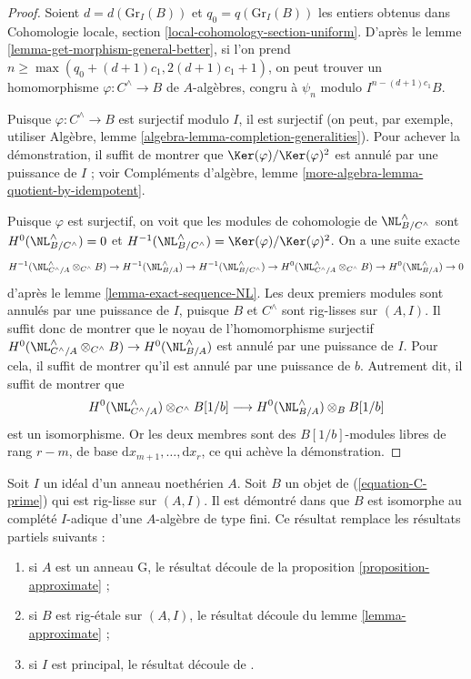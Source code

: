 \begin{proof}
\medskip\noindent
Soient $d = d(\text{Gr}_I(B))$ et $q_0 = q(\text{Gr}_I(B))$ les entiers
obtenus dans Cohomologie locale, section
\ref{local-cohomology-section-uniform}. D'après le lemme
\ref{lemma-get-morphism-general-better}, si l'on prend
$n \geq \max(q_0 + (d + 1)c_1, 2(d + 1)c_1 + 1)$, on peut trouver un
homomorphisme $\varphi : C^\wedge \to B$ de $A$-algèbres, congru à $\psi_n$
modulo $I^{n - (d + 1)c_1}B$.

\medskip\noindent
Puisque $\varphi : C^\wedge \to B$ est surjectif modulo $I$, il est surjectif
(on peut, par exemple, utiliser Algèbre, lemme
\ref{algebra-lemma-completion-generalities}). Pour achever la démonstration, il
suffit de montrer que $\Ker(\varphi)/\Ker(\varphi)^2$ est annulé par une
puissance de $I$ ; voir Compléments d'algèbre, lemme
\ref{more-algebra-lemma-quotient-by-idempotent}.

\medskip\noindent
Puisque $\varphi$ est surjectif, on voit que les modules de cohomologie de
$\NL_{B/C^{\wedge}}^\wedge$ sont
$H^0(\NL_{B/C^{\wedge}}^\wedge) = 0$ et
$H^{-1}(\NL_{B/C^{\wedge}}^\wedge) = \Ker(\varphi)/\Ker(\varphi)^2$.
On a une suite exacte
$$
H^{-1}(\NL_{C^\wedge/A}^\wedge \otimes_{C^\wedge} B) \to
H^{-1}(\NL_{B/A}^\wedge) \to
H^{-1}(\NL_{B/C^{\wedge}}^\wedge) \to
H^0(\NL_{C^\wedge/A}^\wedge \otimes_{C^\wedge} B) \to
H^0(\NL_{B/A}^\wedge) \to 0
$$
d'après le lemme \ref{lemma-exact-sequence-NL}. Les deux premiers modules sont
annulés par une puissance de $I$, puisque $B$ et $C^\wedge$ sont rig-lisses
sur $(A, I)$. Il suffit donc de montrer que le noyau de l'homomorphisme
surjectif
$H^0(\NL_{C^\wedge/A}^\wedge \otimes_{C^\wedge} B) \to
H^0(\NL_{B/A}^\wedge)$ est annulé par une puissance de $I$. Pour cela, il
suffit de montrer qu'il est annulé par une puissance de $b$. Autrement dit,
il suffit de montrer que
$$
H^0(\NL_{C^\wedge/A}^\wedge) \otimes_{C^\wedge} B[1/b]
\longrightarrow
H^0(\NL_{B/A}^\wedge) \otimes_B B[1/b]
$$
est un isomorphisme. Or les deux membres sont des $B[1/b]$-modules libres de
rang $r - m$, de base $\text{d}x_{m + 1}, \ldots, \text{d}x_r$, ce qui achève
la démonstration.
\end{proof}

\begin{remark}
\label{remark-discussion}
Soit $I$ un idéal d'un anneau noethérien $A$. Soit $B$ un objet de
(\ref{equation-C-prime}) qui est rig-lisse sur $(A, I)$. Il est démontré dans
\cite[Theorem 1.2]{gabber-zavyalov} que $B$ est isomorphe au complété $I$-adique
d'une $A$-algèbre de type fini. Ce résultat remplace les résultats partiels
suivants :
\begin{enumerate}
\item si $A$ est un anneau G, le résultat découle de la proposition
\ref{proposition-approximate} ;
\item si $B$ est rig-étale sur $(A, I)$, le résultat découle du lemme
\ref{lemma-approximate} ;
\item si $I$ est principal, le résultat découle de
\cite[III Theorem 7]{Elkik}.
\end{enumerate}
\end{remark}







